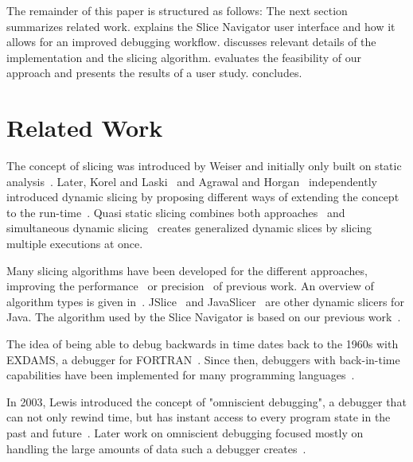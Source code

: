 \documentclass[
			english,
			review,
			]{elsarticle}
\begin{document}
The remainder of this paper is structured as follows:
The next section summarizes related work.
 explains the Slice Navigator user interface and how it allows for an improved debugging workflow.
 discusses relevant details of the implementation and the slicing algorithm.
 evaluates the feasibility of our approach and presents the results of a user study.
 concludes.

\section{Related Work}

The concept of slicing was introduced by Weiser and initially only built on static analysis~\cite{weiser_programmers_1982, weiser_program_1981}.
Later, Korel and Laski~\cite{korel_dynamic_1990} and Agrawal and Horgan~\cite{agrawal_dynamic_1990} independently introduced dynamic slicing by proposing different ways of extending the concept to the run-time~\cite{binkley_theoretical_2006}.
Quasi static slicing combines both approaches~\cite{venkatesh_semantic_1991} and simultaneous dynamic slicing~\cite{hall_automatic_1995} creates generalized dynamic slices by slicing multiple executions at once.

Many slicing algorithms have been developed for the different approaches, improving the performance~\cite{reps_speeding_1994} or precision~\cite{kumar_better_2002, zhang_precise_2003} of previous work.
An overview of algorithm types is given in~\cite{korel_dynamic_1998}.
JSlice~\cite{wang_dynamic_2008} and JavaSlicer~\cite{hammacher_08_design_and_implementation} are other dynamic slicers for Java.
The algorithm used by the Slice Navigator is based on our previous work~\cite{treffer_dynamic_2014}.

The idea of being able to debug backwards in time dates back to the 1960s with EXDAMS, a debugger for FORTRAN~\cite{balzer_exdams_1969}.
Since then, debuggers with back-in-time capabilities have been implemented for many programming languages~\cite{feldman_igor_1988, agrawal_debugging_1993, lieberman_zstep_1997, hofer_design_2006}.

In 2003, Lewis introduced the concept of "omniscient debugging", a debugger that can not only rewind time, but has instant access to every program state in the past and future~\cite{lewis_debugging_2003}.
Later work on omniscient debugging focused mostly on handling the large amounts of data such a debugger creates~\cite{pothier_scalable_2007, lienhard_practical_2008}.
\end{document}
